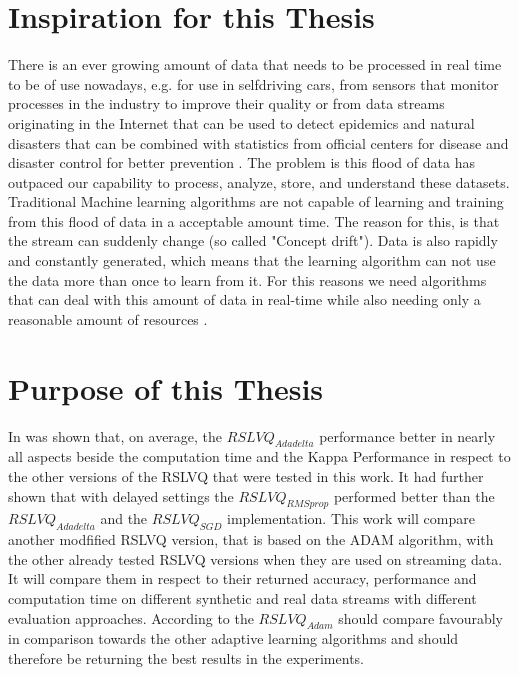 \documentclass[12pt,oneside,a4paper,parskip]{scrbook}
\begin{document}
\section{Inspiration for this Thesis} 
There is an ever growing amount of data that needs to be processed in real time to be of use nowadays, e.g. for use in selfdriving
cars, from sensors that monitor processes in the industry to improve their quality \cite{MLonDataStreams} or from data streams originating in 
the Internet that can be used to detect epidemics and natural disasters that can be combined with statistics from 
official centers for disease and disaster control for better prevention \cite{MLonDataStreams}.
The problem is this flood of data has outpaced our capability to process, analyze, store, and understand these datasets.
Traditional Machine learning algorithms are not capable of learning and training from this flood of data in a acceptable 
amount time. The reason for this, is that the stream can suddenly change (so called "Concept drift"). Data is also 
rapidly and constantly generated, which means that the learning algorithm can not use the data more than once to learn 
from it.
For this reasons we need algorithms that can deal with this amount of data in real-time while also needing only a 
reasonable amount of resources \cite{MLonDataStreams}.

\section{Purpose of this Thesis} 
In \cite{PassiveDriftonRSLVQ} was shown that, on average, the $RSLVQ_\textit{Adadelta}$ performance better in nearly
all aspects beside the computation time and the Kappa Performance in respect to the other versions of the RSLVQ 
that were tested in this work.
It had further shown that with delayed settings the $RSLVQ_\textit{RMSprop}$ performed better than the $RSLVQ_\textit{Adadelta}$
and the $RSLVQ_\textit{SGD}$ implementation.
This work will compare another modfified RSLVQ version, that is based on the ADAM algorithm, with the other already tested
RSLVQ versions when they are used on streaming data. It will compare them in respect to their returned accuracy,
performance and computation time on different synthetic and real data streams with different evaluation approaches.
According to \cite{Kingma2014AdamAM} the $RSLVQ_\textit{Adam}$ should compare favourably in comparison towards the
other adaptive learning algorithms and should therefore be returning the best results in the experiments.
\end{document}
